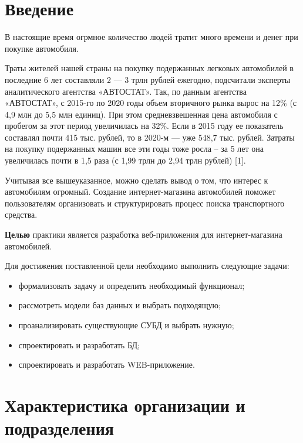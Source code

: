 \documentclass[a4paper,14pt, unknownkeysallowed]{extreport}
\begin{document}
\renewcommand{\contentsname}{Содержание} 
\tableofcontents


\setcounter{page}{3}
\chapter*{Введение}

В настоящие время огрмное количество людей тратит много времени и денег при покупке автомобиля. 

Траты жителей нашей страны на покупку подержанных легковых автомобилей в последние 6 лет составляли 2 --- 3 трлн рублей ежегодно, подсчитали эксперты аналитического агентства «АВТОСТАТ». Так, по данным агентства «АВТОСТАТ», с 2015-го по 2020 годы объем вторичного рынка вырос на 12\% (с 4,9 млн до 5,5 млн единиц). При этом средневзвешенная цена автомобиля с пробегом за этот период увеличилась на 32\%. Если в 2015 году ее показатель составлял почти 415 тыс. рублей, то в 2020-м --- уже 548,7 тыс. рублей. Затраты на покупку подержанных машин все эти годы тоже росла – за 5 лет она увеличилась почти в 1,5 раза (с 1,99 трлн до 2,94 трлн рублей) [1].


Учитывая все вышеуказанное, можно сделать вывод о том, что интерес к автомобилям огромный. Создание интернет-магазина автомобилей поможет пользователям организовать и структурировать процесс поиска транспортного средства.

\textbf{Целью} практики является разработка веб-приложения для интернет-магазина автомобилей.

Для достижения поставленной цели необходимо выполнить следующие задачи:

\begin{itemize}
	\item формализовать задачу и определить необходимый функционал;
	\item рассмотреть модели баз данных и выбрать подходящую;
	\item проанализировать существующие СУБД и выбрать нужную;
 	\item спроектировать и разработать БД;
    \item спроектировать и разработать WEB-приложение.
\end{itemize}

\chapter{Характеристика организации и подразделения}
\end{document}
